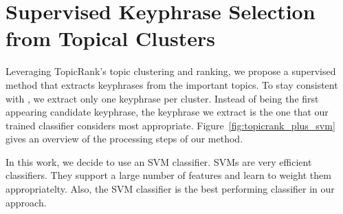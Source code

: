 \section{Supervised Keyphrase Selection\\from Topical Clusters}
\label{sec:supervised_keyphrase_selection_from_topical_clusters}
  Leveraging TopicRank's topic clustering and ranking, we propose a supervised
  method that extracts keyphrases from the important topics. To stay consistent
  with , we extract only one keyphrase per
  cluster. Instead of being the first appearing candidate keyphrase, the
  keyphrase we extract is the one that our trained classifier considers most
  appropriate. Figure~\ref{fig:topicrank_plus_svm} gives an overview of the
  processing steps of our method.

  In this work, we decide to use an SVM classifier. SVMs are very efficient
  classifiers. They support a large number of features and learn to weight them
  appropriatelty. Also, the SVM classifier is the best performing classifier in
  our approach.

